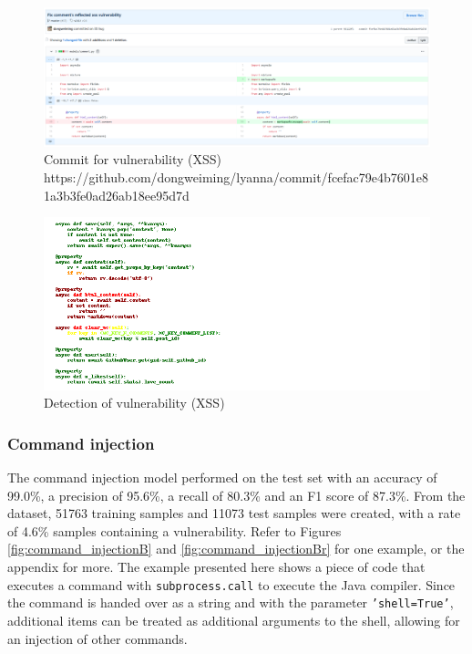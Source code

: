 \documentclass[
a4paper,
pagesize,
pdftex,
12pt,
twoside, %
BCOR=5mm, %
ngerman,
fleqn,
final,
]{scrartcl}
\begin{document}
	\begin{figure}[H]
		\centering
		\includegraphics[width=\linewidth]{Images/xssA}
		\caption{Commit for vulnerability (XSS) \newline \scriptsize{https://github.com/dongweiming/lyanna/commit/fcefac79e4b7601e81a3b3fe0ad26ab18ee95d7d}}
		\label{fig:xssA}
	\end{figure}
	\begin{figure}[H]
		\centering
		\includegraphics[width=\linewidth]{Images/xssAr}
		\caption{Detection of vulnerability (XSS)}
		\label{fig:xssAr}
	\end{figure}
	
	\subsubsection{Command injection}
	The command injection model performed on the test set with an accuracy of 99.0\%, a precision of 95.6\%, a recall of 80.3\% and an F1 score of 87.3\%. From the dataset, 51763 training samples and 11073 test samples were created, with a rate of 4.6\% samples containing a vulnerability. Refer to Figures \ref{fig:command_injectionB} and \ref{fig:command_injectionBr} for one example, or the appendix for more. The example presented here shows a piece of code that executes a command with \texttt{subprocess.call} to execute the Java compiler. Since the command is handed over as a string and with the parameter \texttt{'shell=True'}, additional items can be treated as additional arguments to the shell, allowing for an injection of other commands.
	
\end{document}
